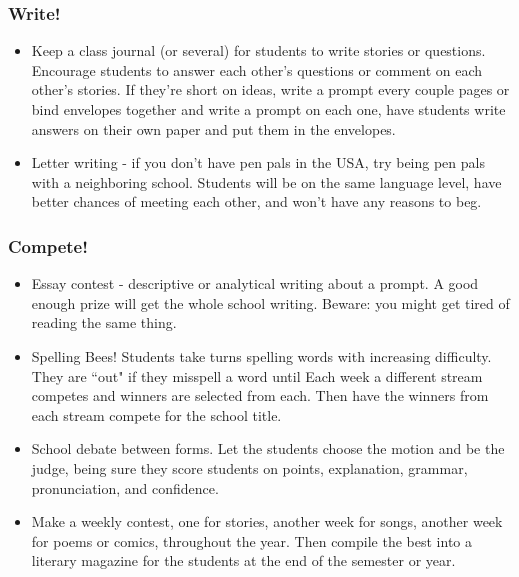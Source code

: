 \documentclass[12pt,a4paper]{report}
\begin{document}
\subsubsection{Write!}
\begin{itemize}
\item{Keep a class journal (or several) for students to write stories or questions. Encourage students to answer each other’s questions or comment on each other’s stories. If they’re short on ideas, write a prompt every couple pages or bind envelopes together and write a prompt on each one, have students write answers on their own paper and put them in the envelopes.}

\item{Letter writing - if you don't have pen pals in the USA, try being pen pals with a neighboring school. Students will be on the same language level, have better chances of meeting each other, and won't have any reasons to beg.}
\end{itemize}

\subsubsection{Compete!}
\begin{itemize}
\item{Essay contest - descriptive or analytical writing about a prompt. A good enough prize will get the whole school writing. Beware: you might get tired of reading the same thing.}

\item{Spelling Bees! Students take turns spelling words with increasing difficulty. They are “out" if they misspell a word until Each week a different stream competes and winners are selected from each. Then have the winners from each stream compete for the school title.}

\item{School debate between forms. Let the students choose the motion and be the judge, being sure they score students on points, explanation, grammar, pronunciation, and confidence.}

\item{Make a weekly contest, one for stories, another week for songs, another week for poems or comics, throughout the year. Then compile the best into a literary magazine for the students at the end of the semester or year.}

\end{itemize}
\end{document}

